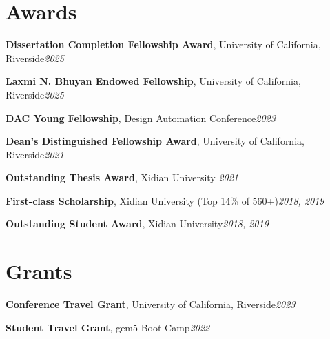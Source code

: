 \documentclass[letterpaper,11pt]{article}
\newcommand{\resumeSubHeadingListStart}{\begin{itemize}[leftmargin=0.15in, label={}]}
\newcommand{\resumeSubHeadingListEnd}{\end{itemize}}
\begin{document}

\section{Awards}
  \vspace{2pt}
  \resumeSubHeadingListStart
    \small{\item{
        \textbf{Dissertation Completion Fellowship Award}, University of California, Riverside\hfill \textit{2025} \\ \vspace{3pt}

        \textbf{Laxmi N. Bhuyan Endowed Fellowship}, University of California, Riverside\hfill \textit{2025} \\ \vspace{3pt}
    
        \textbf{DAC Young Fellowship}, Design Automation Conference\hfill \textit{2023} \\ \vspace{3pt}
    
        \textbf{Dean’s Distinguished Fellowship Award}, University of California, Riverside\hfill \textit{2021} \\ \vspace{3pt}
        
        \textbf{Outstanding Thesis Award}, Xidian University \hfill \textit{2021} \\ \vspace{3pt}
        
        \textbf{First-class Scholarship}, Xidian University (Top 14\% of 560+)\hfill \textit{2018, 2019} \\ \vspace{3pt}
        
        \textbf{Outstanding Student Award}, Xidian University\hfill \textit{2018, 2019} \\ \vspace{3pt}
    }}
  \resumeSubHeadingListEnd

\section{Grants}
  \vspace{2pt}
  \resumeSubHeadingListStart
    \small{\item{

        \textbf{Conference Travel Grant}, University of California, Riverside\hfill \textit{2023} \\ \vspace{3pt}

        \textbf{Student Travel Grant}, gem5 Boot Camp\hfill \textit{2022} \\ \vspace{3pt}
        
    }}
  \resumeSubHeadingListEnd
\end{document}
